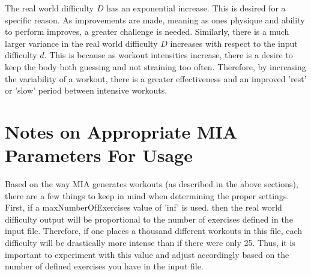 The real world difficulty $D$ has an exponential increase. This is desired for a specific reason. As improvements are made, meaning as ones physique and ability to perform improves, a greater challenge is needed. Similarly, there is a much larger variance in the real world difficulty $D$ increases with respect to the input difficulty $d$. This is because as workout intensities increase, there is a desire to keep the body both guessing and not straining too often. Therefore, by increasing the variability of a workout, there is a greater effectiveness and an improved 'rest' or 'slow' period between intensive workouts. 

\section{Notes on Appropriate MIA Parameters For Usage}

Based on the way MIA generates workouts (as described in the above sections), there are a few things to keep in mind when determining the proper settings. First, if a maxNumberOfExercises value of 'inf' is used, then the real world difficulty output will be proportional to the number of exercises defined in the input file. Therefore, if one places a thousand different workouts in this file, each difficulty will be drastically more intense than if there were only 25. Thus, it is important to experiment with this value and adjust accordingly based on the number of defined exercises you have in the input file.

 


